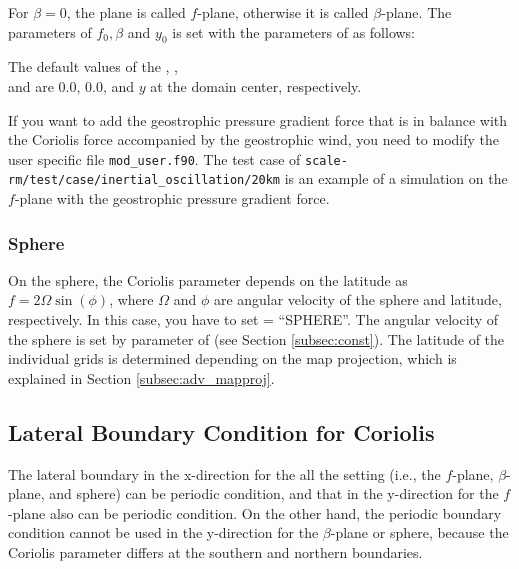 For $\beta=0$, the plane is called $f$-plane, otherwise it is called $\beta$-plane.
The parameters of $f_0, \beta$ and $y_0$ is set with the parameters of  as follows:

The default values of the , , \\
and  are 0.0, 0.0, and $y$ at the domain center, respectively.

If you want to add the geostrophic pressure gradient force that is in balance with the Coriolis force accompanied by the geostrophic wind, you need to modify the user specific file \verb|mod_user.f90|. %
The test case of \verb|scale-rm/test/case/inertial_oscillation/20km| is an example of a simulation on the $f$-plane with the geostrophic pressure gradient force.


\subsubsection{Sphere}
On the sphere, the Coriolis parameter depends on the latitude as $f = 2\Omega \sin(\phi)$, where $\Omega$ and $\phi$ are angular velocity of the sphere and latitude, respectively.
In this case, you have to set  = ``SPHERE''.
The angular velocity of the sphere is set by  parameter of  (see Section \ref{subsec:const}).
The latitude of the individual grids is determined depending on the map projection, which is explained in Section \ref{subsec:adv_mapproj}.



\subsection{Lateral Boundary Condition for Coriolis}

The lateral boundary in the x-direction for the all the setting (i.e., the $f$-plane, $\beta$-plane, and sphere) can be periodic condition, and that in the y-direction for the $f$-plane also can be periodic condition.
On the other hand, the periodic boundary condition cannot be used in the y-direction for the $\beta$-plane or sphere, because the Coriolis parameter differs at the southern and northern boundaries.


